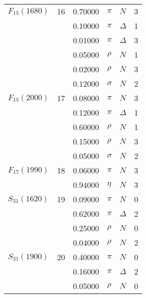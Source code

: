 \documentclass[a4paper,10pt]{article}
\begin{document}
\begin{tabular}[t]{lrllll} 
\toprule
$      F_{15}(1680)  $& 16& 0.70000&$ \pi                 $ &$ N                   $& 3\\
$                    $&   & 0.10000&$ \pi                 $ &$ \Delta              $& 1\\
$                    $&   & 0.01000&$ \pi                 $ &$ \Delta              $& 3\\
$                    $&   & 0.05000&$ \rho                $ &$ N                   $& 1\\
$                    $&   & 0.02000&$ \rho                $ &$ N                   $& 3\\
$                    $&   & 0.12000&$ \sigma              $ &$ N                   $& 2\\
\midrule
$      F_{15}(2000)  $& 17& 0.08000&$ \pi                 $ &$ N                   $& 3\\
$                    $&   & 0.12000&$ \pi                 $ &$ \Delta              $& 1\\
$                    $&   & 0.60000&$ \rho                $ &$ N                   $& 1\\
$                    $&   & 0.15000&$ \rho                $ &$ N                   $& 3\\
$                    $&   & 0.05000&$ \sigma              $ &$ N                   $& 2\\
\midrule
$      F_{17}(1990)  $& 18& 0.06000&$ \pi                 $ &$ N                   $& 3\\
$                    $&   & 0.94000&$ \eta                $ &$ N                   $& 3\\
\midrule
$      S_{31}(1620)  $& 19& 0.09000&$ \pi                 $ &$ N                   $& 0\\
$                    $&   & 0.62000&$ \pi                 $ &$ \Delta              $& 2\\
$                    $&   & 0.25000&$ \rho                $ &$ N                   $& 0\\
$                    $&   & 0.04000&$ \rho                $ &$ N                   $& 2\\
\midrule
$      S_{31}(1900)  $& 20& 0.40000&$ \pi                 $ &$ N                   $& 0\\
$                    $&   & 0.16000&$ \pi                 $ &$ \Delta              $& 2\\
$                    $&   & 0.05000&$ \rho                $ &$ N                   $& 0\\

\end{tabular}
\end{document}
